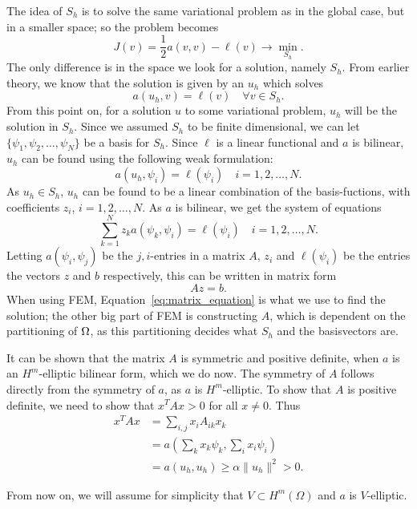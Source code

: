 The idea of $S_h$ is to solve the same variational problem as in the global case, 
but in a smaller space; so the problem becomes
\begin{equation*}
    J(v) = \frac{1}{2}a(v,v) - \ell(v) \to \underset{S_h}{\min}.
\end{equation*}
The only difference is in the space we look for a solution, namely $S_h$. From 
earlier theory, we know that the solution is given by an $u_h$ which solves
\begin{equation*}
    a(u_h,v) = \ell(v) \quad \forall v \in S_h.
\end{equation*}
From this point on, for a solution $u$ to some variational problem, $u_h$ will be the solution in $S_h$.
Since we assumed $S_h$ to be finite dimensional, we can let $ \{ \psi_1, \psi_2, \ldots, \psi_N \}$ 
be a basis for $S_h$. Since $\ell$ is a linear functional and $a$ is bilinear, 
$u_h$ can be found using the following weak formulation:
\begin{equation*}
    a(u_h, \psi_i) = \ell(\psi_i) \quad i = 1, 2, \ldots, N.
\end{equation*}
As $u_h \in S_h$, $u_h$ can be found to be a linear combination of the basis-fuctions, with 
coefficients $z_i$, $i=1, 2, \ldots, N$. As $a$ is bilinear, we get the system of 
equations
\begin{equation*}
    \sum_{k=1}^N z_k a(\psi_k,\psi_i) = \ell(\psi_i) \quad i = 1,2,\ldots,N.
\end{equation*}
Letting $a(\psi_i,\psi_j)$ be the $j,i$-entries in a matrix $A$, $z_i$ and $\ell(\psi_i)$ 
be the entries the vectors $z$ and $b$ respectively, this can be written in matrix form 
\begin{equation}
    Az = b. \label{eq:matrix_equation}
\end{equation}
When using FEM, Equation~\eqref{eq:matrix_equation} is what we use to find the solution; 
the other big part of FEM is constructing $A$, which is dependent on the partitioning of $\Omega$, 
as this partitioning decides what $S_h$ and the basisvectors are.

It can be shown that the matrix $A$ is symmetric and positive definite, when $a$ is an $H^m$-elliptic bilinear form, which we do now. 
The symmetry of $A$ follows directly from the symmetry of $a$, as $a$ is $H^m$-elliptic.
To show that $A$ is positive definite, we need to show that $x^T Ax > 0$ for all $x \neq 0$. Thus
\begin{align*}
    x^T Ax &= \sum_{i,j} x_i A_{ik}x_k \\
    &= a\left(\sum_{k} x_k\psi_k,\sum_{i} x_i\psi_i\right) \\
    &= a(u_h,u_h) \geq \alpha \|u_h\|^2 > 0.
\end{align*}

From now on, we will assume for simplicity that $V\subset H^m(\Omega)$ and $a$ is $V$-elliptic. %

